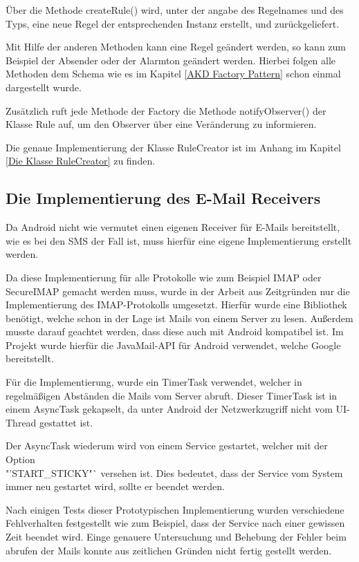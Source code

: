 \"Uber die Methode createRule() wird, unter der angabe des Regelnames und des Typs, eine neue Regel der entsprechenden Instanz erstellt, und zur\"uckgeliefert.

Mit Hilfe der anderen Methoden kann eine Regel ge\"andert werden, so kann zum Beispiel der Absender oder der Alarmton ge\"andert werden. Hierbei folgen alle Methoden dem Schema wie es im Kapitel \ref{AKD Factory Pattern} schon einmal dargestellt wurde.
 

Zus\"atzlich ruft jede Methode der Factory die Methode notifyObserver() der Klasse Rule auf, um den Observer \"uber eine Ver\"anderung zu informieren.

Die genaue Implementierung der Klasse RuleCreator ist im Anhang im Kapitel \ref{Die Klasse RuleCreator} zu finden. 

\subsection{Die Implementierung des E-Mail Receivers}
Da Android nicht wie vermutet einen eigenen Receiver f\"ur E-Mails bereitstellt, wie es bei den SMS der Fall ist, muss hierf\"ur eine eigene Implementierung erstellt werden.

Da diese Implementierung f\"ur alle Protokolle wie zum Beispiel IMAP oder SecureIMAP gemacht werden muss, wurde in der Arbeit aus Zeitgr\"unden nur die Implementierung des IMAP-Protokolls umgesetzt. Hierf\"ur wurde eine Bibliothek ben\"otigt, welche schon in der Lage ist Mails von einem Server zu lesen. Au\ss{}erdem musste darauf geachtet werden, dass diese auch mit Android kompatibel ist. Im Projekt wurde hierf\"ur die JavaMail-API f\"ur Android verwendet, welche Google bereitstellt. \cite{MailAPI}

F\"ur die Implementierung, wurde ein TimerTask verwendet, welcher in regelm\"a\ss{}igen Abst\"anden die Mails vom Server abruft. Dieser TimerTask ist in einem AsyncTask gekapselt, da unter Android der Netzwerkzugriff nicht vom UI-Thread gestattet ist. 

Der AsyncTask wiederum wird von einem Service gestartet, welcher mit der Option \\"'START\_STICKY"` versehen ist. Dies bedeutet, dass der Service vom System immer neu gestartet wird, sollte er beendet werden.

Nach einigen Tests dieser Prototypischen Implementierung wurden verschiedene Fehlverhalten festgestellt wie zum Beispiel, dass der Service nach einer gewissen Zeit beendet wird.
Einge genauere Untersuchung und Behebung der Fehler beim abrufen der Mails konnte aus zeitlichen Gr\"unden nicht fertig gestellt werden.

